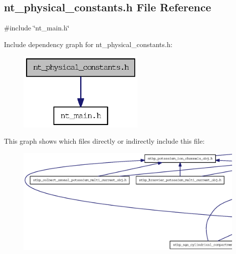 \subsection{nt\_\-physical\_\-constants.h File Reference}
\label{nt__physical__constants_8h}
{\ttfamily \#include \char`\"{}nt\_\-main.h\char`\"{}}\par
Include dependency graph for nt\_\-physical\_\-constants.h:
\nopagebreak
\begin{figure}[H]
\begin{center}
\leavevmode
\includegraphics[width=174pt]{nt__physical__constants_8h__incl}
\end{center}
\end{figure}
This graph shows which files directly or indirectly include this file:
\nopagebreak
\begin{figure}[H]
\begin{center}
\leavevmode
\includegraphics[width=400pt]{nt__physical__constants_8h__dep__incl}
\end{center}
\end{figure}
